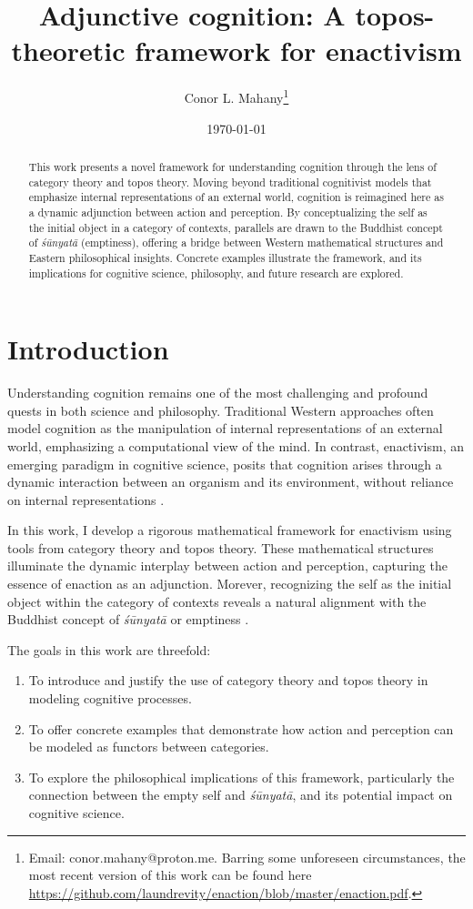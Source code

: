 \documentclass{article}
\title{Adjunctive cognition: A topos-theoretic framework for enactivism}
\author{Conor L. Mahany\footnote{
    Email: conor.mahany@proton.me. Barring some unforeseen circumstances, the most recent version of this work can be found here \href{https://github.com/laundrevity/enaction/blob/master/enaction.pdf}{https://github.com/laundrevity/enaction/blob/master/enaction.pdf}.
}}
\date{\today}
\begin{document}
\maketitle

\begin{abstract}
    This work presents a novel framework for understanding cognition through the lens of category theory and topos theory. Moving beyond traditional cognitivist models that emphasize internal representations of an external world, cognition is reimagined here as a dynamic adjunction between action and perception. By conceptualizing the self as the initial object in a category of contexts, parallels are drawn to the Buddhist concept of \emph{śūnyatā} (emptiness), offering a bridge between Western mathematical structures and Eastern philosophical insights. Concrete examples illustrate the framework, and its implications for cognitive science, philosophy, and future research are explored.
\end{abstract}

\tableofcontents

\section{Introduction}

Understanding cognition remains one of the most challenging and profound quests in both science and philosophy. Traditional Western approaches often model cognition as the manipulation of internal representations of an external world, emphasizing a computational view of the mind. In contrast, enactivism, an emerging paradigm in cognitive science, posits that cognition arises through a dynamic interaction between an organism and its environment, without reliance on internal representations \cite{varela1991}.

In this work, I develop a rigorous mathematical framework for enactivism using tools from category theory and topos theory. These mathematical structures illuminate the dynamic interplay between action and perception, capturing the essence of enaction as an adjunction. Morever, recognizing the self as the initial object within the category of contexts reveals a natural alignment with the Buddhist concept of \emph{śūnyatā} or emptiness \cite{garfield1995}.

The goals in this work are threefold:
\begin{enumerate}
    \item To introduce and justify the use of category theory and topos theory in modeling cognitive processes.
    \item To offer concrete examples that demonstrate how action and perception can be modeled as functors between categories.
    \item To explore the philosophical implications of this framework, particularly the connection between the empty self and \emph{śūnyatā}, and its potential impact on cognitive science.

\end{enumerate}
\end{document}
